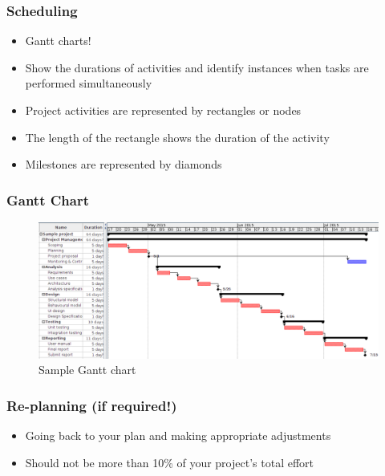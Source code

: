 \documentclass{beamer}
\begin{document}
\begin{frame}[t]\frametitle{Scheduling}
\begin{itemize}
        \item Gantt charts!
        \item Show the durations of activities and identify instances when tasks are performed simultaneously
        \item Project activities are represented by rectangles or nodes
        \item The length of the rectangle shows the duration of the activity
        \item Milestones are represented by diamonds
    \end{itemize}
\end{frame}

\begin{frame}[t]\frametitle{Gantt Chart}
\begin{figure}[htb!]
    \begin{center}
        \includegraphics[width=6in]{../img/sample_gantt}
    \end{center}
    \caption{Sample Gantt chart}
    \label{fig:figure1}
\end{figure}

\end{frame}


\begin{frame}[t]\frametitle{Re-planning (if required!)}
\begin{itemize}
        \item Going back to your plan and making appropriate adjustments
        \item Should not be more than 10\% of your project's total effort
    \end{itemize}
\end{frame}
\end{document}
